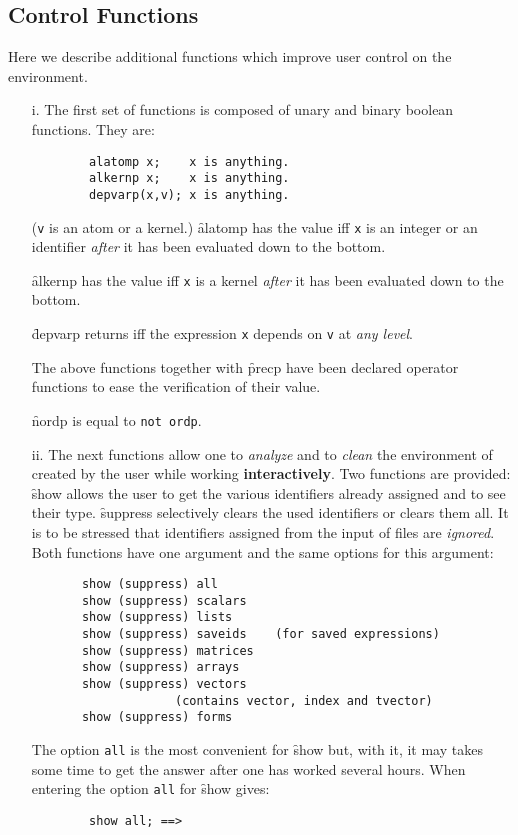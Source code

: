 \subsection{Control Functions}
Here we describe additional functions which
improve user control on the environment.
\begin{itemize}
\item[i.]
\hypertarget{operator:ALATOMP}{}
\hypertarget{operator:ALKERNP}{}
\hypertarget{operator:DEPVARP}{}
The first set of functions is composed of unary and binary boolean functions.
They are:
\begin{verbatim}
        alatomp x;    x is anything.
        alkernp x;    x is anything.
        depvarp(x,v); x is anything.
\end{verbatim}
(\texttt{v} is an atom or a kernel.)
\f{alatomp} has the value  iff \texttt{x} is an integer or  an identifier
\emph{after} it has been evaluated down to the bottom.

\f{alkernp} has the value  iff \texttt{x} is a kernel \emph{after}
it has been evaluated down to the bottom.

\f{depvarp} returns  iff the expression \texttt{x} depends on \texttt{v} at
\emph{any level}.

\hypertarget{operator:PRECP}{}
\hypertarget{operator:NORDP}{}
The above functions together with \f{precp} have
been declared operator functions to ease the verification of
their value.

\f{nordp} is equal to \texttt{not ordp}.
\item[ii.]
The next functions allow one to \emph{analyze} and to
\emph{clean} the environment
of \REDUCE created by the user while working
\textbf{interactively}. Two functions are provided:\\
\hypertarget{operator:SHOW}{}
\hypertarget{operator:SUPPRESS}{}
\f{show} allows the user to get the various identifiers already
assigned and to see their type. \f{suppress} selectively clears the
used identifiers or clears them all. It is to be stressed that identifiers
assigned from the input of files are \emph{ignored}.
Both functions have one argument and the same options for this
argument:
\begin{verbatim}
       show (suppress) all
       show (suppress) scalars
       show (suppress) lists
       show (suppress) saveids    (for saved expressions)
       show (suppress) matrices
       show (suppress) arrays
       show (suppress) vectors
                    (contains vector, index and tvector)
       show (suppress) forms
\end{verbatim}
The option \texttt{all} is the most convenient for \f{show} but,
with it, it may
takes some time to get the answer after one has worked several hours.
When entering \REDUCE the option \texttt{all} for \f{show} gives:
\begin{verbatim}
        show all; ==>


\end{verbatim}
\end{itemize}
